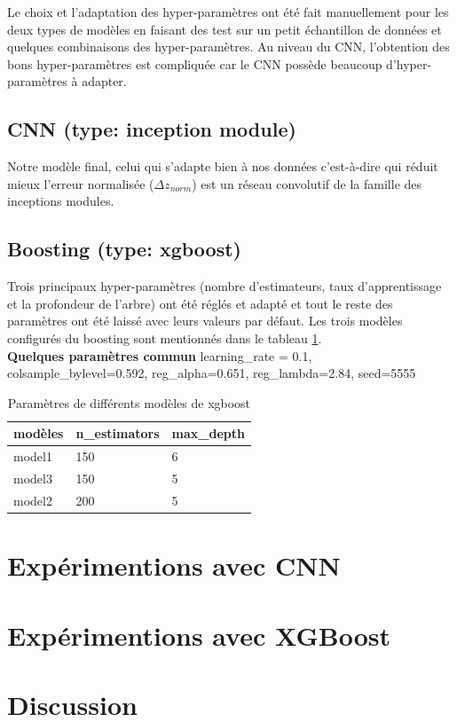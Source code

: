 Le choix et l'adaptation des hyper-paramètres ont été fait manuellement pour les deux types de modèles en faisant des test sur un petit échantillon de données et quelques combinaisons des hyper-paramètres. Au niveau du CNN, l'obtention des bons hyper-paramètres est compliquée car le CNN possède beaucoup d'hyper-paramètres à adapter.
\subsection{CNN (type: inception module)}
Notre modèle final, celui qui s'adapte bien à nos données c'est-à-dire qui réduit mieux l'erreur normalisée ($\Delta z_{norm}$) est un réseau convolutif de la famille des inceptions modules. 
\subsection{Boosting (type: xgboost)}
Trois principaux hyper-paramètres (nombre d'estimateurs, taux d'apprentissage et la profondeur de l'arbre) ont été réglés et adapté et tout le reste des paramètres ont été laissé avec leurs valeurs par défaut. Les trois modèles configurés du boosting sont mentionnés dans le tableau \ref{param_boost}.\\
\textbf{Quelques paramètres commun}
learning\_rate = 0.1, colsample\_bylevel=0.592, reg\_alpha=0.651, reg\_lambda=2.84, seed=5555
\begin{table}[H]
    \centering
    \begin{tabular}{|l|l|l|}
         \hline 
         modèles&n\_estimators&max\_depth\\
         \hline
          model1 &150&6\\
         \hline
         model3&150&5\\
         \hline         
         model2 &200&5\\
         \hline
    \end{tabular}
    \caption{Paramètres de différents modèles de xgboost}
    \label{param_boost}
\end{table}

\section{Expérimentions avec CNN}
\section{Expérimentions avec XGBoost}
\section{Discussion}


















